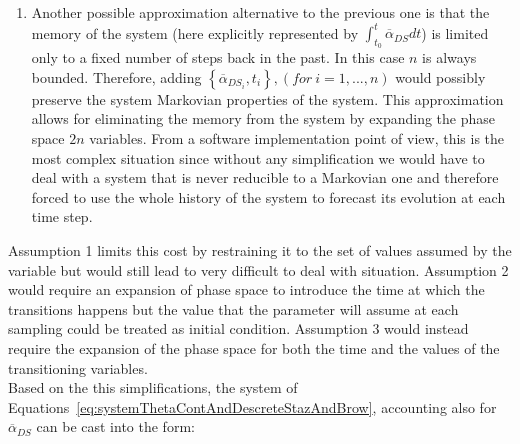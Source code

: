 \begin{enumerate}
  \item Another possible approximation alternative to the previous one is that the memory of the system (here 
  explicitly represented by $ \int_{t_{0}}^{t}  \overline{\alpha }_{DS} dt$) is limited 
  only to a fixed number of steps back in the past. In this case $n$ is always bounded. Therefore, adding  $\left \{  
  \overline{\alpha}_{DS_{i}},t_{i} \right \}, \left ( for\: i=1,...,n \right )$ would possibly preserve the system 
  Markovian properties of the system. This approximation allows for eliminating the memory from the system by 
  expanding the phase space $2n$ variables. From a software implementation point of view, this is the most 
  complex  situation since without any simplification we would have to deal with a system that is never reducible 
  to a Markovian one and therefore forced to use the whole history of the system to forecast its evolution at each 
  time step.
\end{enumerate}
Assumption 1 limits this cost by restraining it to the set of values assumed by the 
variable but would still lead to very difficult to deal with situation. Assumption 2 would 
require an expansion of phase space to introduce the time at which the transitions 
happens but the value that the parameter will assume at each sampling could be 
treated as initial condition. Assumption 3 would instead require the expansion of the 
phase space for both the time and the values of the 
transitioning variables.
\\Based on the this simplifications, the system of 
Equations~\ref{eq:systemThetaContAndDescreteStazAndBrow}, accounting also for $ \overline{\alpha}_{DS}$ can be cast into the form:

